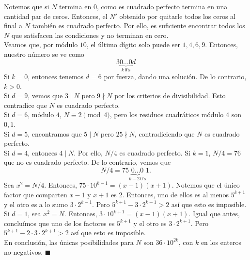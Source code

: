 Notemos que si $N$ termina en $0$, como es cuadrado perfecto termina en una cantidad par de ceros. Entonces, el $N'$ obtenido por quitarle todos los ceros al final a $N$ también es cuadrado perfecto. Por ello, es suficiente encontrar todos los $N$ que satisfacen las condiciones y no terminan en cero.\\
Veamos que, por módulo $10$, el último dígito solo puede ser $1,4,6,9$. Entonces, nuestro número se ve como 
\[ 3\underbrace{0\ldots0}_{k\,0\text{'s}}d \]
Si $k=0$, entonces tenemos $d=6$ por fuerza, dando una solución. De lo contrario, $k>0$.\\
Si $d=9$, vemos que $3\mid N$ pero $9\nmid N$ por los criterios de divisibilidad. Esto contradice que $N$ es cuadrado perfecto.\\
Si $d=6$, módulo $4$, $N\equiv2\pmod 4$, pero los residuos cuadráticos módulo $4$ son $0,1$.\\
Si $d=5$, encontramos que $5\mid N$ pero $25\nmid N$, contradiciendo que $N$ es cuadrado perfecto.\\
Si $d=4$, entonces $4\mid N$. Por ello, $N/4$ es cuadrado perfecto. Si $k=1$, $N/4=76$ que no es cuadrado perfecto. De lo contrario, vemos que
\[ N/4=75\underbrace{0\ldots0}_{k-2\,0\text{'s}}1. \]
Sea $x^2=N/4$. Entonces, $75\cdot10^{k-1}=(x-1)(x+1)$. Notemos que el único factor que comparten $x-1$ y $x+1$ es $2$. Entonces, uno de ellos es al menos $5^{k+1}$ y el otro es a lo sumo $3\cdot 2^{k-1}$. Pero $5^{k+1}-3\cdot 2^{k-1}>2$ así que esto es imposible.\\
Si $d=1$, sea $x^2=N$. Entonces, $3\cdot10^{k+1}=(x-1)(x+1)$. Igual que antes, concluímos que uno de los factores es $5^{k+1}$ y el otro es $3\cdot 2^{k+1}$. Pero $5^{k+1}-2\cdot3\cdot2^{k+1}>2$ así que esto es imposible.\\
En conclusión, las únicas posibilidades para $N$ son $36\cdot10^{2k}$, con $k$ en los enteros no-negativos. $\blacksquare$
